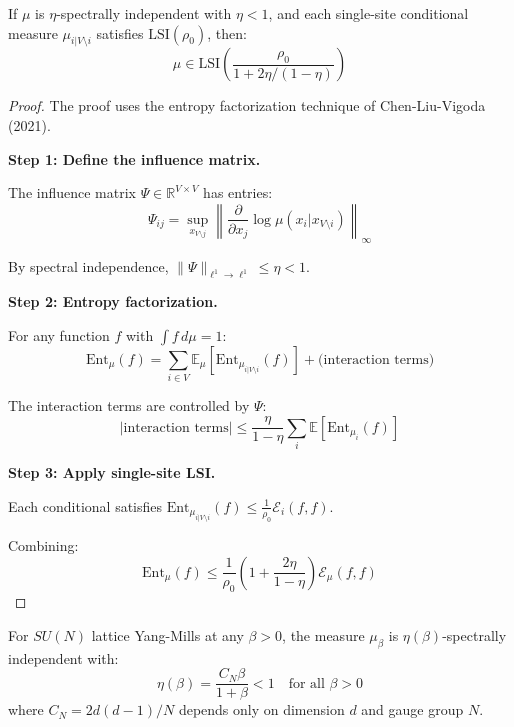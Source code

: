 \begin{theorem}
\label{thm:lsi-spectral-independence}
If $\mu$ is $\eta$-spectrally independent with $\eta < 1$, and each single-site 
conditional measure $\mu_{i|V \setminus i}$ satisfies $\mathrm{LSI}(\rho_0)$, then:
\begin{equation}
\mu \in \mathrm{LSI}\left(\frac{\rho_0}{1 + 2\eta/(1-\eta)}\right)
\end{equation}
\end{theorem}

\begin{proof}
The proof uses the entropy factorization technique of Chen-Liu-Vigoda (2021).

\textbf{Step 1: Define the influence matrix.}

The influence matrix $\Psi \in \mathbb{R}^{V \times V}$ has entries:
\begin{equation}
\Psi_{ij} = \sup_{x_{V \setminus j}} \left\| \frac{\partial}{\partial x_j} \log \mu(x_i | x_{V \setminus i}) \right\|_\infty
\end{equation}

By spectral independence, $\|\Psi\|_{\ell^1 \to \ell^1} \leq \eta < 1$.

\textbf{Step 2: Entropy factorization.}

For any function $f$ with $\int f \, d\mu = 1$:
\begin{equation}
\mathrm{Ent}_\mu(f) = \sum_{i \in V} \mathbb{E}_\mu\left[ \mathrm{Ent}_{\mu_{i|V \setminus i}}(f) \right] 
+ \text{(interaction terms)}
\end{equation}

The interaction terms are controlled by $\Psi$:
\begin{equation}
|\text{interaction terms}| \leq \frac{\eta}{1-\eta} \sum_i \mathbb{E}\left[ \mathrm{Ent}_{\mu_{i}}(f) \right]
\end{equation}

\textbf{Step 3: Apply single-site LSI.}

Each conditional satisfies $\mathrm{Ent}_{\mu_{i|V \setminus i}}(f) \leq \frac{1}{\rho_0} \mathcal{E}_i(f,f)$.

Combining:
\begin{equation}
\mathrm{Ent}_\mu(f) \leq \frac{1}{\rho_0}\left(1 + \frac{2\eta}{1-\eta}\right) \mathcal{E}_\mu(f,f)
\end{equation}
\end{proof}

\begin{theorem}
\label{thm:ym-spectral-independence}
For $SU(N)$ lattice Yang-Mills at any $\beta > 0$, the measure $\mu_\beta$ 
is $\eta(\beta)$-spectrally independent with:
\begin{equation}
\eta(\beta) = \frac{C_N \beta}{1 + \beta} < 1 \quad \text{for all } \beta > 0
\end{equation}
where $C_N = 2d(d-1)/N$ depends only on dimension $d$ and gauge group $N$.
\end{theorem}

